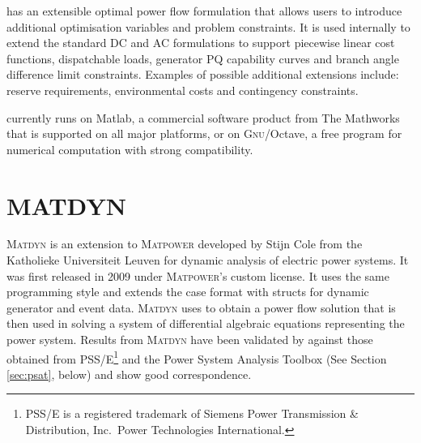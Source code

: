 \matpower has an extensible optimal power flow formulation that allows users
to introduce additional optimisation variables and problem constraints.  It is
used internally to extend the standard DC and AC formulations to support
piecewise linear cost functions, dispatchable loads, generator PQ capability
curves and branch angle difference limit constraints. Examples of possible
additional extensions include: reserve requirements, environmental costs and
contingency constraints.

\matpower currently runs on Matlab, a
commercial software product from The Mathworks that is supported on all
major platforms, or on \textsc{Gnu}/Octave, a free
program for numerical computation with strong \matlab compatibility.

\section{MATDYN}
\textsc{Matdyn} is an extension to \textsc{Matpower} developed by Stijn Cole
from the Katholieke Universiteit Leuven for dynamic analysis of electric power
systems. It was first released in 2009 under \textsc{Matpower}'s custom license.
It uses the same programming style and extends the \matpower case format with
structs for dynamic generator and event data.  \textsc{Matdyn} uses \matpower to
obtain a power flow solution that is then used in solving a system of
differential algebraic equations representing the power system. Results from
\textsc{Matdyn} have been validated by  against those
obtained from PSS/E\footnote{PSS/E is a registered trademark of Siemens Power
Transmission \& Distribution, Inc.~Power Technologies International.} and the
Power System Analysis Toolbox (See Section \ref{sec:psat}, below) and show good
correspondence.

